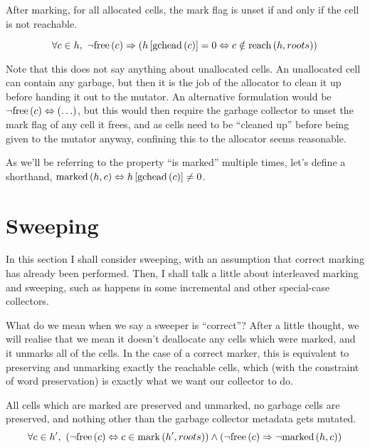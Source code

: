 \begin{definition}
  \label{def:ms-correct-marking}
  After marking, for all allocated cells, the mark flag is unset if
  and only if the cell is not reachable.

  \[\forall c \in h,\ \lnot\mathrm{free}\left(c\right) \Rightarrow
  \left(h\left[\mathrm{gchead}\left(c\right)\right] = 0 \Leftrightarrow c \notin
    \mathrm{reach}\left(h, roots\right)\right)\]
\end{definition}

Note that this does not say anything about unallocated cells. An
unallocated cell can contain any garbage, but then it is the job of
the allocator to clean it up before handing it out to the mutator. An
alternative formulation would be $\lnot\mathrm{free}\left(c\right) \Leftrightarrow
\left(\ldots\right)$, but this would then require the garbage
collector to unset the mark flag of any cell it frees, and as cells
need to be ``cleaned up'' before being given to the mutator anyway,
confining this to the allocator seems reasonable.

As we'll be referring to the property ``is marked'' multiple times,
let's define a shorthand, $\mathrm{marked}\left(h, c\right) \Leftrightarrow h\left[\mathrm{gchead}\left(c\right)\right]
\neq 0$.

\section{Sweeping}
\label{sec:marksweep-sweeping}

In this section I shall consider sweeping, with an assumption that
correct marking has already been performed. Then, I shall talk a
little about interleaved marking and sweeping, such as happens in some
incremental and other special-case collectors.

What do we mean when we say a sweeper is ``correct''? After a little
thought, we will realise that we mean it doesn't deallocate any cells
which were marked, and it unmarks all of the cells. In the case of a
correct marker, this is equivalent to preserving and unmarking exactly
the reachable cells, which (with the constraint of word preservation)
is exactly what we want our collector to do.

\begin{definition}
  \label{def:ms-correct-sweeping}
  All cells which are marked are preserved and unmarked, no garbage
  cells are preserved, and nothing other than the garbage collector
  metadata gets mutated.
  \[\forall c \in h',\ \left(\lnot\mathrm{free}\left(c\right) \Leftrightarrow c \in
    \mathrm{mark}\left(h', roots\right)\right) \land \left(\lnot\mathrm{free}\left(c\right) \Rightarrow
    \lnot\mathrm{marked}\left(h, c\right)\right)\]
\end{definition}

